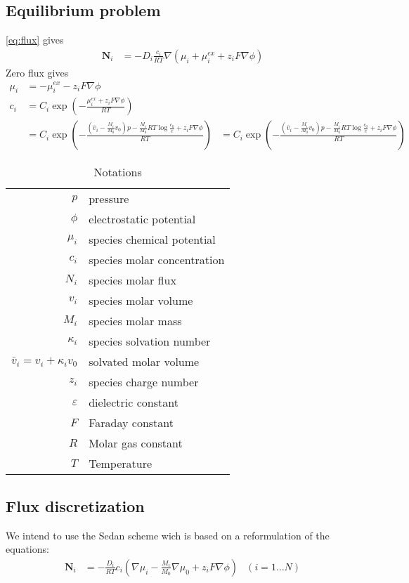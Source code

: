 \documentclass[12pt,oneside,reqno]{amsart}
\numberwithin{equation}{section}
\begin{document}
\subsection{Equilibrium problem}
\eqref{eq:flux} gives
\begin{align}\label{eq:flux}
  \mathbf N_i &= - D_i\frac{c_i}{RT}\nabla\left( \mu_i +  \mu_i^{ex} + z_i F \nabla \phi \right)
\end{align}
Zero flux gives 
\begin{align}
  \mu_i   &=   - \mu_i^{ex} - z_i F \nabla \phi\\
  c_i   &=  C_i\exp\left( -\frac{\mu_i^{ex} + z_i F \nabla \phi}{RT}\right)\\
        &=  C_i \exp\left(-\frac{\left(\bar v_i-\frac{M_i}{M_0}v_0\right)p - \frac{M_i}{M_0}RT\log \frac{c_0}{\bar c} + z_i F \nabla \phi}{RT}\right)
        &=  C_i \exp\left(-\frac{\left(\bar v_i-\frac{M_i}{M_0}v_0\right)p - \frac{M_i}{M_0}RT\log \frac{c_0}{\bar c} + z_i F \nabla \phi}{RT}\right)
\end{align}


\begin{table}
  \begin{tabular}{rl}
    $p$ & pressure\\
    $\phi $ &electrostatic potential\\
    $\mu_i$& species chemical potential\\
    $c_i$& species molar concentration\\
    $N_i$& species molar flux\\
    $v_i$ & species molar volume\\ 
    $M_i$ & species molar mass\\
    $\kappa_i$ & species solvation number\\
    $\bar v_i = v_i + \kappa_i v_0$ & solvated molar volume\\
    $z_i$ & species charge number\\
    $\varepsilon$& dielectric constant\\
    $F$ & Faraday constant\\
    $R$ & Molar gas constant\\
    $T$ & Temperature
  \end{tabular}
  \medskip
  
  \caption{Notations}
  \label{tab:notations}
\end{table}

\subsection{Flux discretization}
We intend to use the Sedan scheme wich is based on a reformulation of the equations:
\begin{align*}
  \mathbf N_i &= - \frac{D_i}{RT} c_i \left( \nabla \mu_i - \frac{M_i}{M_0}\nabla \mu_0 + z_i F \nabla \phi \right)& (i=1\dots N) \label{eq:NP}
\end{align*}
\end{document}

